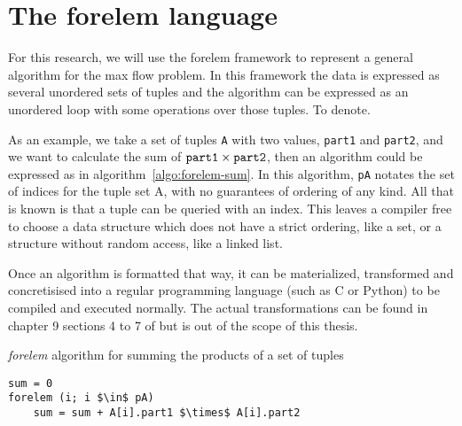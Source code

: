 \section{The forelem language}

For this research, we will use the forelem framework \cite{Rietveld} to represent a general algorithm for the max flow problem. In this framework the data is expressed as several unordered sets of tuples and the algorithm can be expressed as an unordered loop with some operations over those tuples. To denote.

As an example, we take a set of tuples \texttt{A} with two values, \texttt{part1} and \texttt{part2}, and we want to calculate the sum of $\text{\texttt{part1}} \times \text{\texttt{part2}}$, then an algorithm could be expressed as in algorithm~\ref{algo:forelem-sum}. In this algorithm, \texttt{pA} notates the set of indices for the tuple set A, with no guarantees of ordering of any kind. All that is known is that a tuple can be queried with an index. This leaves a compiler free to choose a data structure which does not have a strict ordering, like a set, or a structure without random access, like a linked list.

Once an algorithm is formatted that way, it can be materialized, transformed and concretisised into a regular programming language (such as C or Python) to be compiled and executed normally. The actual transformations can be found in chapter 9 sections 4 to 7 of \cite{Rietveld} but is out of the scope of this thesis.

\begin{algorithm}
\caption{\emph{forelem} algorithm for summing the products of a set of tuples}
\label{algo:forelem-sum}
\begin{lstlisting}[mathescape]
sum = 0
forelem (i; i $\in$ pA)
	sum = sum + A[i].part1 $\times$ A[i].part2
\end{lstlisting}
\end{algorithm}
